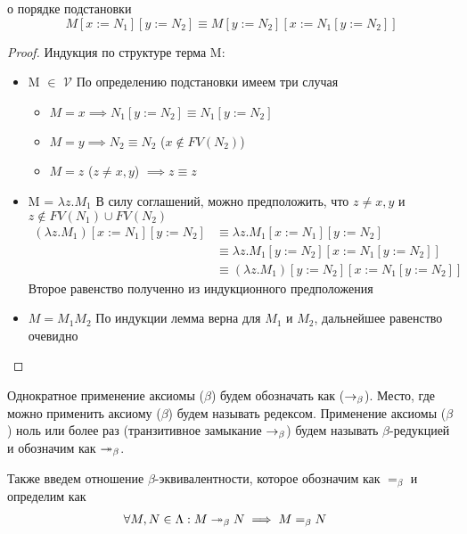 \documentclass[lambda.tex]{subfiles}
\begin{document}
\begin{lemma}{о порядке подстановки}
	\[M[x := N_1][y := N_2] \equiv M[y := N_2][x := N_1[y := N_2]]\]
\end{lemma}
\begin{proof}
	Индукция по структуре терма M: \\
	\begin{itemize}
		\item M $\in$ $\mathcal{V}$ По определению подстановки имеем три случая
		\begin{itemize}
		 	\item $M = x \implies N_1[y := N_2] \equiv N_1[y := N_2]$
		 	\item $M = y \implies N_2 \equiv N_2$ ($x\not\in FV(N_2)$)
		 	\item $M = z$ ($z \neq x, y$) $\implies z \equiv z$
		 \end{itemize}
		 \item M = $\lambda z.M_1$
		 В силу соглашений, можно предположить, что $z \neq x,y$ и $z\not\in FV(N_1) \cup FV(N_2)$
		 \begin{align*}
		 	(\lambda z.M_1)[x := N_1][y := N_2] &\equiv \lambda z.M_1[x := N_1][y := N_2]\\
		 										&\equiv \lambda z.M_1[y := N_2][x := N_1[y := N_2]] \\
		 										&\equiv (\lambda z.M_1)[y := N_2][x := N_1[y := N_2]]
		 \end{align*}
		 Второе равенство полученно из индукционного предположения
		 \item $M = M_1 M_2$
		 По индукции лемма верна для $M_1$ и $M_2$, дальнейшее равенство очевидно
	\end{itemize}
\end{proof}

Однократное применение аксиомы ($\beta$) будем обозначать как ($\rightarrow_\beta$). Место, где можно применить аксиому ($\beta$) будем называть редексом. 
Применение аксиомы ($\beta$) ноль или более раз (транзитивное замыкание $\rightarrow_\beta$) будем называть $\beta$-редукцией и обозначим как $\twoheadrightarrow_\beta$.

Также введем отношение $\beta$-эквивалентности, которое обозначим как $=_\beta$ и определим как
\begin{align*}
	&\forall M,N \in \Lambda: M \twoheadrightarrow_\beta N \implies M=_\beta N
\end{align*}
\end{document}
